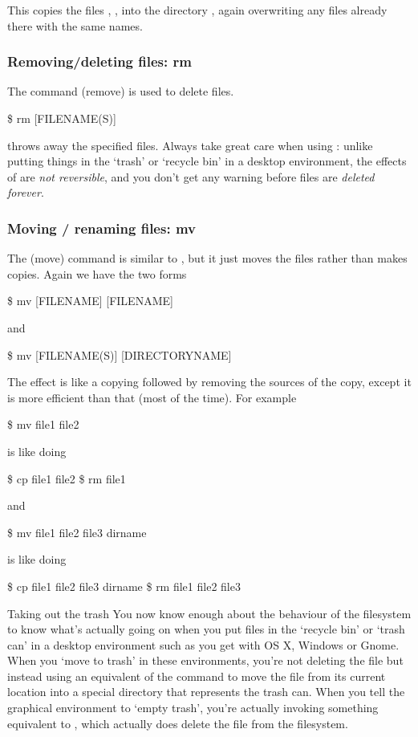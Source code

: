 This copies the files , ,  into
the directory , again overwriting any files already
there with the same names.

\subsubsection{Removing/deleting files: rm}

The command  (remove) is used to delete files.
\begin{ttoutenv}
\$  rm [FILENAME(S)]
\end{ttoutenv}
%
throws away the specified files. Always take great care when using : unlike putting things in the `trash' or `recycle bin' in a desktop environment, the effects of  are \textit{not reversible}, and you don't get any warning before files are \textit{deleted forever}. 


\subsubsection{Moving / renaming files: mv}

The  (move) command is similar to , but it just moves
the files rather than makes copies. Again we have the two forms
\begin{ttoutenv}
\$  mv [FILENAME] [FILENAME] \return
\end{ttoutenv}
and
\begin{ttoutenv}
\$  mv [FILENAME(S)] [DIRECTORYNAME] \return
\end{ttoutenv}

The effect is like a copying followed by removing the sources of the copy,
except it is more efficient than that (most of the time).
For example
\begin{ttoutenv}
\$  mv file1 file2 \return
\end{ttoutenv}
is like doing
\begin{ttoutenv}
\$  cp file1 file2 \return
\$  rm file1
\end{ttoutenv}
and
\begin{ttoutenv}
\$  mv file1 file2 file3 dirname \return
\end{ttoutenv}
is like doing
\begin{ttoutenv}
\$  cp file1 file2 file3 dirname \return
\$  rm file1 file2 file3
\end{ttoutenv}


\begin{diversion}{Taking out the trash}
You now know enough about the behaviour of the filesystem to know what's actually going on when you put files in the `recycle bin' or `trash can' in a desktop environment such as you get with OS X, Windows or Gnome. When you `move to trash' in these environments, you're not deleting the file but instead using an equivalent of the  command to move the file from its current location into a special directory that represents the trash can. When you tell the graphical environment to `empty trash', you're actually invoking something equivalent to , which actually does delete the file from the filesystem.
\end{diversion}

